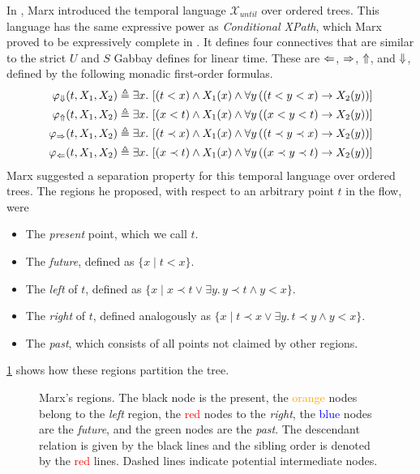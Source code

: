 \documentclass[a4paper,UKenglish,cleveref, autoref, thm-restate, numberwithinsect]{lipics-v2021}
\def\Larrow{\ensuremath\mathord{\Leftarrow}}
\def\Rarrow{\ensuremath\mathord{\Rightarrow}}
\def\Uarrow{\ensuremath\mathord{\Uparrow}}
\def\Darrow{\ensuremath\mathord{\Downarrow}}
\begin{document}
In \cite{xpathComplete}, Marx introduced the temporal language $\mathcal{X}_{until}$ over ordered trees. This language has the same expressive power as \textit{Conditional XPath}, which Marx proved to be expressively complete in \cite{marx2005conditional}. It defines four connectives that are similar to the strict $U$ and $S$ Gabbay defines for linear time. These are $\Larrow$, $\Rarrow$, $\Uarrow$, and $\Darrow$, defined by the following monadic first-order formulas.
\begin{equation*}
    \begin{aligned}
        \varphi_{\Darrow}(t, X_1, X_2) &\triangleq \exists x.\, \left[ \left( t < x \right) \land X_1(x) \land \forall y \left( \left( t < y < x \right) \to X_2(y) \right) \right]\\
        \varphi_{\Uarrow}(t, X_1, X_2) &\triangleq \exists x.\, \left[ \left( x < t \right) \land X_1(x) \land \forall y \left( \left( x < y < t \right) \to X_2(y) \right) \right]\\
        \varphi_{\Rarrow}(t, X_1, X_2) &\triangleq \exists x.\, \left[ \left( t \prec x \right) \land X_1(x) \land \forall y \left( \left( t \prec y \prec x \right) \to X_2(y) \right) \right]\\
        \varphi_{\Larrow}(t, X_1, X_2) &\triangleq \exists x.\, \left[ \left( x \prec t \right) \land X_1(x) \land \forall y \left( \left( x \prec y \prec t \right) \to X_2(y) \right) \right]
    \end{aligned}
\end{equation*}
Marx suggested a separation property for this temporal language over ordered trees. The regions he proposed, with respect to an arbitrary point $t$ in the flow, were
\begin{itemize} %
    \item The \textit{present} point, which we call $t$.
    \item The \textit{future}, defined as $\{x \mid t < x \}$.
    \item The \textit{left} of $t$, defined as $\{x \mid x \prec t \lor \exists y.\, y \prec t \land y < x \}$.
    \item The \textit{right} of $t$, defined analogously as $\{x \mid t \prec x \lor \exists y.\, t \prec y \land y < x \}$.
    \item The \textit{past}, which consists of all points not claimed by other regions.
\end{itemize}
\cref{fig:marx-regions} shows how these regions partition the tree.
\begin{figure}[h]
    \centering
    \caption[]{Marx's regions. The black node is the present, the \textcolor{orange}{orange} nodes belong to the \textit{left} region, the \textcolor{red}{red} nodes to the \textit{right}, the \textcolor{blue}{blue} nodes are the \textit{future}, and the \textcolor{OliveGreen}{green} nodes are the \textit{past}. The descendant relation is given by the black lines and the sibling order is denoted by the \textcolor{red}{red} lines. Dashed lines indicate potential intermediate nodes.}
    \label{fig:marx-regions}
\end{figure}
\end{document}
